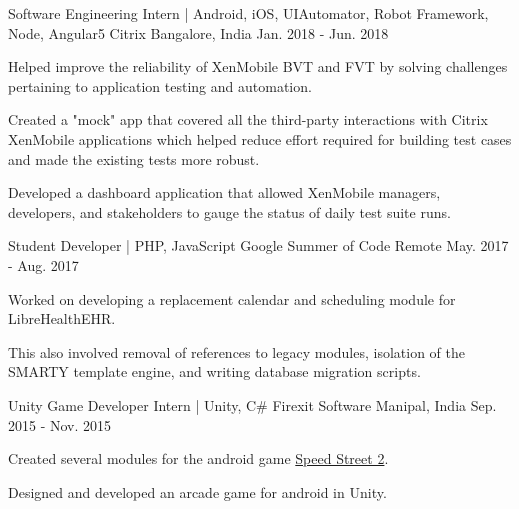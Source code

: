 

\begin{cventries}

  \cventry
    {Software Engineering Intern | Android, iOS, UIAutomator, Robot Framework, Node, Angular5} %
    {Citrix} %
    {Bangalore, India} %
    {Jan. 2018 - Jun. 2018} %
    {
      \begin{cvitems} %
      	\item {Helped improve the reliability of XenMobile BVT and FVT by solving challenges pertaining to application testing and automation.}
      	\item {Created a "mock" app that covered all the third-party interactions with Citrix XenMobile applications which helped reduce effort required for building test cases and made the existing tests more robust. }
        \item {Developed a dashboard application that allowed XenMobile managers, developers, and stakeholders to gauge the status of daily test suite runs.}
      \end{cvitems}
    }

  \cventry
    {Student Developer | PHP, JavaScript} %
    {Google Summer of Code} %
    {Remote} %
    {May. 2017 - Aug. 2017} %
    {
      \begin{cvitems} %
        \item {Worked on developing a replacement calendar and scheduling module for LibreHealthEHR.}
        \item {This also involved removal of references to legacy modules, isolation of the SMARTY template engine, and writing database migration scripts.}
      \end{cvitems}
    }

  \cventry
    {Unity Game Developer Intern | Unity, C\#} %
    {Firexit Software} %
    {Manipal, India} %
    {Sep. 2015 - Nov. 2015} %
    {
      \begin{cvitems} %
        \item {Created several modules for the android game {\href{https://play.google.com/store/apps/details?id=com.firexit.speedstreet2VRdemo}{Speed Street 2}}.}
        \item {Designed and developed an arcade game for android in Unity.}
      \end{cvitems}
    }

\end{cventries}
